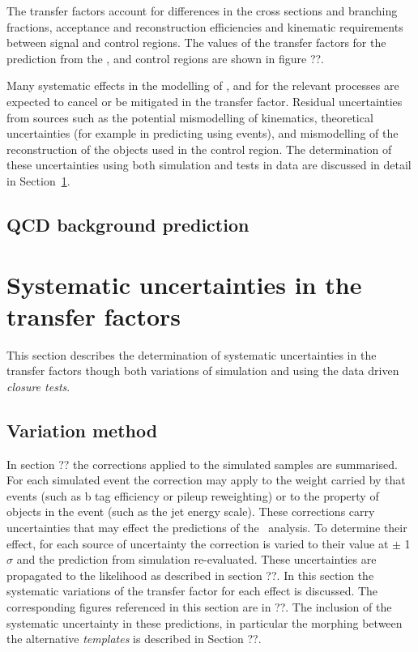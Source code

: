The transfer factors account for differences in the cross sections and branching fractions,
acceptance and reconstruction efficiencies and kinematic requirements between signal 
and control regions. The values of the transfer factors for the prediction from the \mj,
\mmj and \gj control regions are shown in figure ??.

Many systematic effects in the modelling of \scalht, \nb and \njet for the relevant processes 
are expected to cancel or be mitigated in the transfer factor. Residual uncertainties from
sources such as the potential mismodelling of kinematics, theoretical uncertainties (for example
in predicting \znunu using \gj events), and mismodelling of the reconstruction of the objects
used in the control region. The determination of these uncertainties using both simulation 
and tests in data are discussed in detail in Section~\ref{sec:syst-uncs}. 

\subsection{QCD background prediction}
\section{Systematic uncertainties in the transfer factors}
\label{sec:syst-uncs}
This section describes the determination of systematic uncertainties 
in the transfer factors though both variations of simulation
and using the data driven \emph{closure tests}. 

\subsection{Variation method}
In section ?? the corrections applied to the simulated samples are summarised. For each 
simulated event the correction may apply to the weight carried by that events (such as b tag efficiency
or pileup reweighting) or to the property of objects in the event (such as the jet energy scale). 
These corrections carry uncertainties that may effect the predictions of the \alphat~analysis.
To determine their effect, for each source of uncertainty the correction is varied to their
value at $\pm$ 1 $\sigma$ and the prediction from simulation re-evaluated. These uncertainties are
propagated to the likelihood as described in section ??. In this section the systematic variations
of the transfer factor for each effect is discussed. The corresponding figures referenced in
this section are in ??. The inclusion of the systematic uncertainty in these predictions, in particular
the morphing between the alternative \emph{templates} is described in Section ??.
